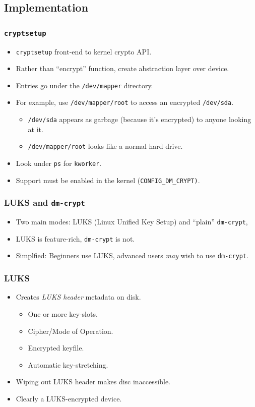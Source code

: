 \documentclass[xcolor={dvipsnames,svgnames},hyperref=dvips]{beamer}
\begin{document}
	\subsection{Implementation}
	\begin{frame}
		\frametitle{\texttt{cryptsetup}}
		\begin{itemize}
		\item \texttt{cryptsetup} front-end to kernel crypto API.
		\item Rather than ``encrypt'' function, create abstraction layer over device.
		\item Entries go under the \texttt{/dev/mapper} directory.
		\item For example, use \texttt{/dev/mapper/root} to access an encrypted \texttt{/dev/sda}.
			\begin{itemize}
			\item \texttt{/dev/sda} appears as garbage (because it's encrypted) to anyone looking at it.
			\item \texttt{/dev/mapper/root} looks like a normal hard drive.
			\end{itemize}
		\item Look under \texttt{ps} for \texttt{kworker}.
		\item Support must be enabled in the kernel (\texttt{CONFIG\_DM\_CRYPT)}.
		\end{itemize}
	\end{frame}

	\begin{frame}
		\frametitle{LUKS and \texttt{dm-crypt}}
		\begin{itemize}
		\item Two main modes: LUKS (Linux Unified Key Setup) and ``plain'' \texttt{dm-crypt},
		\item LUKS is feature-rich, \texttt{dm-crypt} is not.
		\item Simplfied: Beginners use LUKS, advanced users \textit{may} wish to use \texttt{dm-crypt}.
		\end{itemize}
	\end{frame}

	\begin{frame}
		\frametitle{LUKS}
		\begin{itemize}
		\item Creates \textit{LUKS header} metadata on disk.
			\begin{itemize}
			\item One or more key-slots.
			\item Cipher/Mode of Operation.
			\item Encrypted keyfile.
			\item Automatic key-stretching.
			\end{itemize}
		\item Wiping out LUKS header makes disc inaccessible.
		\item Clearly a LUKS-encrypted device.
		\end{itemize}
	\end{frame}
\end{document}
